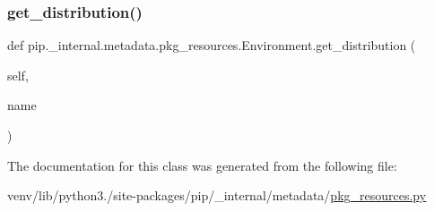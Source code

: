 \mbox{\label{classpip_1_1__internal_1_1metadata_1_1pkg__resources_1_1Environment_afdb2c49973452ed0a746c92133e5ae3f}} 
\subsubsection{\texorpdfstring{get\+\_\+distribution()}{get\_distribution()}}
{\footnotesize\ttfamily def pip.\+\_\+internal.\+metadata.\+pkg\+\_\+resources.\+Environment.\+get\+\_\+distribution (\begin{DoxyParamCaption}\item[{}]{self,  }\item[{}]{name }\end{DoxyParamCaption})}



The documentation for this class was generated from the following file\+:\begin{DoxyCompactItemize}
\item 
venv/lib/python3./site-\/packages/pip/\+\_\+internal/metadata/\hyperlink{metadata_2pkg__resources_8py}{pkg\+\_\+resources.\+py}\end{DoxyCompactItemize}
